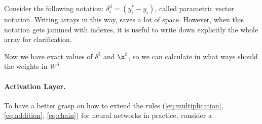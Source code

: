 Consider the following notation:
$
    \delta^3_i = (y^*_i - y_i)
$, 
called parametric vector notation. Writing arrays in this way, saves a lot of space. However, when this notation gets jammed with indexes, it is useful to write down explicitly the whole array for clarification.

Now we have exact values of $\delta^3$ and $\x^3$, so we can calculate in what ways should the weights in $W^3$
\paragraph{Activation Layer.} To have a better grasp on how to extend the rules (\ref{eq:multiplication}, \ref{eq:addition}, \ref{eq:chain}) for neural networks in practice, consider a 